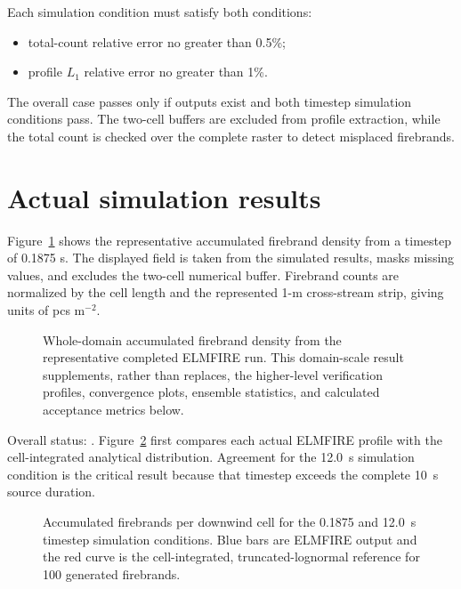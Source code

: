 Each simulation condition must satisfy both conditions:
\begin{itemize}
  \item total-count relative error no greater than 0.5\%;
  \item profile $L_1$ relative error no greater than 1\%.
\end{itemize}
The overall case passes only if outputs exist and both timestep simulation conditions pass.
The two-cell buffers are excluded from profile extraction, while the total
count is checked over the complete raster to detect misplaced firebrands.

\section{Actual simulation results}

Figure~\ref{fig:domain-result} shows the representative accumulated firebrand density from a timestep of 0.1875 s.
The displayed field is taken from the simulated results, masks missing values, and excludes
the two-cell numerical buffer.  Firebrand counts are normalized by the cell length and the represented 1-m cross-stream strip, giving units of pcs m$^{-2}$.

\begin{figure}[H]
\centering
{}
\caption{Whole-domain accumulated firebrand density from the representative completed ELMFIRE run.  This
domain-scale result supplements, rather than replaces, the higher-level verification
profiles, convergence plots, ensemble statistics, and calculated acceptance metrics below.}
\label{fig:domain-result}
\end{figure}

Overall status: \textbf{}. Figure~\ref{fig:generation-duration}
first compares each actual ELMFIRE profile with the cell-integrated analytical
distribution. Agreement for the 12.0~s simulation condition is the critical result because
that timestep exceeds the complete 10~s source duration.

\begin{figure}[H]
  \centering
  \caption{Accumulated firebrands per downwind cell for the 0.1875 and 12.0~s
  timestep simulation conditions. Blue bars are ELMFIRE output and the red curve is the
  cell-integrated, truncated-lognormal reference for 100 generated firebrands.}
  \label{fig:generation-duration}
\end{figure}

